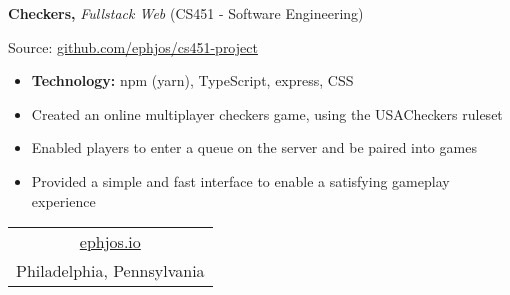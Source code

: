 \documentclass[10pt]{article}
\begin{document}
\vspace{-0.75em}
\textbf{Checkers,}
\emph{Fullstack Web}
(CS451 - Software Engineering)

\indent \indent Source:
\href{https://github.com/ephjos/cs451-project}
{github.com/ephjos/cs451-project}

\vspace{-\topsep}
\begin{itemize}
    \setlength\itemsep{-0.5em}
    \item \textbf{Technology:} npm (yarn), TypeScript, express, CSS
    \item Created an online multiplayer checkers game, using the
        USACheckers ruleset
    \item Enabled players to enter a queue on the server and be paired
        into games
    \item Provided a simple and fast interface to enable a satisfying
        gameplay experience
\end{itemize}

\hrulefill

\begin{center}
    \begin{tabular}{c}
        \href{http://ephjos.io}{ephjos.io} \\
        Philadelphia, Pennsylvania \\
    \end{tabular}
\end{center}
\end{document}
